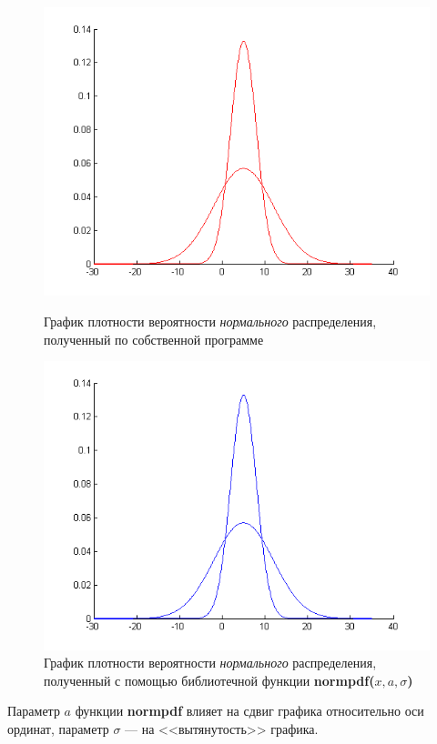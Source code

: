\begin{figure}[h]
  \begin{minipage}[h]{0.47\linewidth}
    \includegraphics[width=1\linewidth]{pic/norm_our}
    \caption{График плотности вероятности \textit{нормального} распределения, полученный по собственной программе}
  \end{minipage}
  \hfill
  \begin{minipage}[h]{0.47\linewidth}
    \vspace{4mm}
    \includegraphics[width=1\linewidth]{pic/norm_lib}
    \caption{График плотности вероятности \textit{нормального} распределения, полученный с помощью библиотечной функции \textbf{normpdf($x,a,\sigma$)}}
  \end{minipage}
\end{figure}

Параметр $a$ функции \textbf{normpdf} влияет на сдвиг графика относительно оси ординат,
параметр $\sigma$ --- на <<вытянутость>> графика.
 
\newpage
